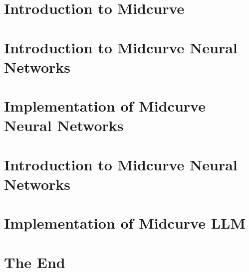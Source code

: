 \section[Intro]{Introduction to Midcurve}


\section[NN]{Introduction to Midcurve Neural Networks}


\section[NNIMPL]{Implementation of Midcurve Neural Networks}


\section[LLM]{Introduction to Midcurve Neural Networks}


\section[LLMIMPL]{Implementation of Midcurve LLM}


\section[End]{The End}


